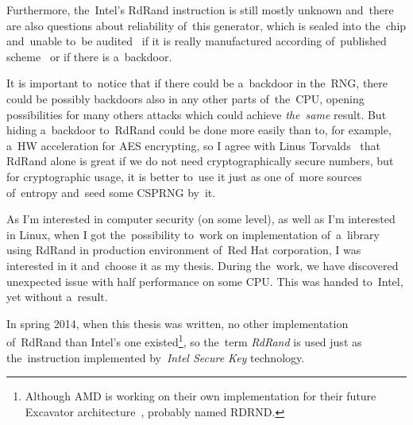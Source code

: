 \par{
Furthermore, the~Intel's RdRand instruction is still mostly unknown 
and~there are also questions about reliability of~this generator, 
which is sealed into the~chip and~unable to~be audited~\cite{TheodoreTsoNSA} 
if it is really manufactured according of~published 
scheme~\cite{AnalysisOfDRNG} or if there is a~backdoor. 
}

\par{
It is important to~notice that if there could be a~backdoor in the~RNG, 
there could be possibly backdoors also in any other parts of~the~CPU, opening 
possibilities for many others attacks which could achieve {\em the~same} result. 
But hiding a~backdoor to~RdRand could be done more easily than to, 
for example, a~HW acceleration for AES encrypting, so I agree with Linus 
Torvalds~\cite{PetitionRdRand} that RdRand alone is great if we do not need cryptographically secure 
numbers, but for cryptographic usage, it is better to~use it just as one of~more 
sources of~entropy and~seed some CSPRNG by~it.
}

\par{
As I'm interested in computer security (on some level), 
as well as I'm interested in Linux, 
when I got the~possibility to~work on implementation of~a~library using RdRand
in production environment of~Red Hat corporation, 
I was interested in it and~choose it as my thesis. 
During the~work, we have discovered unexpected issue with half performance 
on some CPU. This was handed to~Intel, yet without a~result. 
}
\par{
In spring 2014, when this thesis was written, no other implementation of~RdRand than Intel's 
one existed\footnote{Although AMD is working on their own implementation 
for their future Excavator architecture~\cite{AMDRdRand}, probably named 
RDRND.},
so the~term {\em RdRand} is used just as the~instruction implemented 
by~{\em Intel Secure Key} technology.
}



